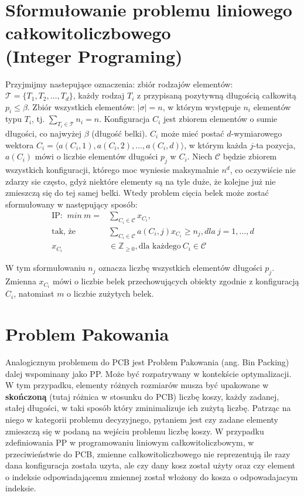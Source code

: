 \section{Sformułowanie problemu liniowego całkowitoliczbowego \\ (Integer Programing)} \label{linear_formula}
Przyjmijmy nastepujące oznaczenia: zbiór rodzajów elementów: $\mathcal{T} = \{T_1, T_2, \dots, T_d\}$, każdy rodzaj $T_i$ z przypisaną pozytywną długością całkowitą $p_i \leq \beta$. Zbiór wszystkich elementów: $|\mathcal{\sigma}| = n$, w którym występuje $n_i$ elementów typu $T_i$, tj. $\sum_{T_i \in \mathcal{T}} n_i = n$.
Konfiguracja $C_i$ jest zbiorem elementów o sumie długości, co najwyżej $\beta$ (długość belki). $C_i$ może mieć postać $d$-wymiarowego wektora $C_i = \langle a(C_i, 1), a(C_i,2), \dots, a(C_i,d)\rangle$, w którym każda $j$-ta pozycja, $a(C_i)$ mówi o liczbie elementów długości $p_j$ w $C_i$. Niech $\mathcal{C}$ będzie zbiorem wszystkich konfiguracji, którego moc wyniesie maksymalnie $n^d$, co oczywiście nie zdarzy sie często, gdyż niektóre elementy są na tyle duże, że kolejne już nie zmieszczą się do tej samej belki.
Wtedy problem cięcia belek może zostać sformułowany w następujący sposób:
\begin{align}
	\text{IP: } \ min \ m =&\sum_{C_i \in \mathcal{C}} x_{C_i}, \\
	\text{tak, że} &\sum_{C_i \in \mathcal{C}} a(C_i,j)x_{C_i} \geq n_j, dla \ j = 1, \dots, d \\
	x_{C_i} &\in \mathbb{Z}_{\geq 0}, \text{dla każdego} \ C_i \in \mathcal{C} 
\end{align}

W tym sformułowaniu $n_j$ oznacza liczbę wszystkich elementów długości $p_j$. Zmienna $x_{C_i}$ mówi o liczbie belek przechowujących obiekty zgodnie z konfiguracją $C_i$, natomiast $m$ o liczbie zużytych belek.

\section{Problem Pakowania}
Analogicznym problemem do PCB jest Problem Pakowania (ang. Bin Packing) dalej wspominany jako PP.
Może być rozpatrywany w kontekście optymalizacji. W tym przypadku, elementy różnych rozmiarów musza być upakowane w \textbf{skończoną} (tutaj różnica w stosunku do PCB) liczbę koszy, każdy zadanej, stałej długości, w taki sposób który zminimalizuje ich zużytą liczbę. Patrząc na niego w kategorii problemu decyzyjnego, pytaniem jest czy zadane elementy zmieszczą się w podaną na wejściu problemu liczbę koszy.
W przypadku zdefiniowania PP w programowaniu liniowym całkowitoliczbowym, w przeciwieństwie do PCB, zmienne całkowitoliczbowego nie reprezentują ile razy dana konfiguracja została uzyta, ale czy dany kosz został użyty oraz czy element o indeksie odpowiadającemu zmiennej został włożony do kosza o odpowadajacym indeksie.

